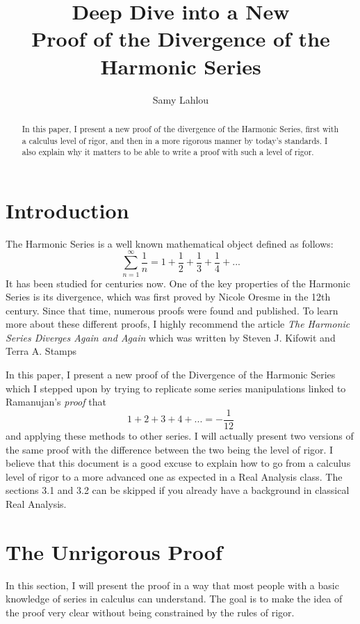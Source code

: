 \documentclass[12pt]{article}
\title{Deep Dive into a New \\ Proof of the Divergence of the Harmonic Series}
\author{Samy Lahlou}
\date{}
\theoremstyle{definition}
\newcounter{prop}[section]
\begin{document}
\maketitle

\begin{abstract}
    In this paper, I present a new proof of the divergence of the Harmonic Series, first with a calculus level of rigor, and then in a more rigorous manner by today's standards. I also explain why it matters to be able to write a proof with such a level of rigor.
\end{abstract}

\tableofcontents

\newpage

\section{Introduction}
The Harmonic Series is a well known mathematical object defined as follows:
$$\sum_{n=1}^{\infty}\frac{1}{n} = 1 + \frac{1}{2} + \frac{1}{3} + \frac{1}{4} + ...$$
It has been studied for centuries now. One of the key properties of the Harmonic Series is its divergence, which was first proved by Nicole Oresme in the 12th century. Since that time, numerous proofs were found and published. To learn more about these different proofs, I highly recommend the article \textit{The Harmonic Series Diverges Again and Again} which was written by Steven J. Kifowit and Terra A. Stamps \cite{harmonicseries} 

In this paper, I present a new proof of the Divergence of the Harmonic Series which I stepped upon by trying to replicate some series manipulations linked to Ramanujan's \textit{proof} that
$$1 + 2 + 3 + 4 + ... = -\frac{1}{12}$$
and applying these methods to other series. I will actually present two versions of the same proof with the difference between the two being the level of rigor. I believe that this document is a good excuse to explain how to go from a calculus level of rigor to a more advanced one as expected in a Real Analysis class. The sections 3.1 and 3.2 can be skipped if you already have a background in classical Real Analysis.

\section{The Unrigorous Proof}

In this section, I will present the proof in a way that most people with a basic knowledge of series in calculus can understand. The goal is to make the idea of the proof very clear without being constrained by the rules of rigor. 
\end{document}

